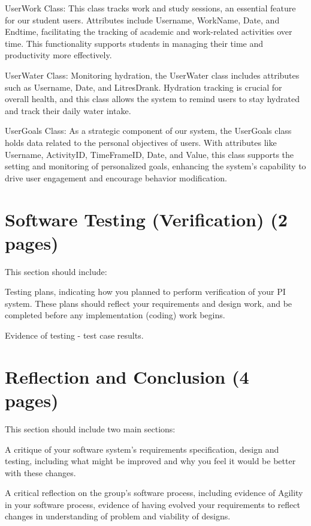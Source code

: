 \documentclass[12pt]{article}
\begin{document}
UserWork Class: This class tracks work and study sessions, an essential feature for our student users. Attributes include Username, WorkName, Date, and Endtime, facilitating the tracking of academic and work-related activities over time. This functionality supports students in managing their time and productivity more effectively.\par

UserWater Class: Monitoring hydration, the UserWater class includes attributes such as Username, Date, and LitresDrank. Hydration tracking is crucial for overall health, and this class allows the system to remind users to stay hydrated and track their daily water intake.\par

UserGoals Class: As a strategic component of our system, the UserGoals class holds data related to the personal objectives of users. With attributes like Username, ActivityID, TimeFrameID, Date, and Value, this class supports the setting and monitoring of personalized goals, enhancing the system's capability to drive user engagement and encourage behavior modification.\par



\section{Software Testing (Verification) (2 pages)}

This section should include:

Testing plans, indicating how you planned to perform verification of your PI system.
These plans should reflect your requirements and design work, and be completed
before any implementation (coding) work begins.

Evidence of testing - test case results.


\section{Reflection and Conclusion (4 pages)}

This section should include two main sections:

A critique of your software system’s requirements specification, design and testing,
including what might be improved and why you feel it would be better with these
changes.

A critical reflection on the group’s software process, including evidence of Agility in
your software process, evidence of having evolved your requirements to reflect
changes in understanding of problem and viability of designs.
\end{document}
